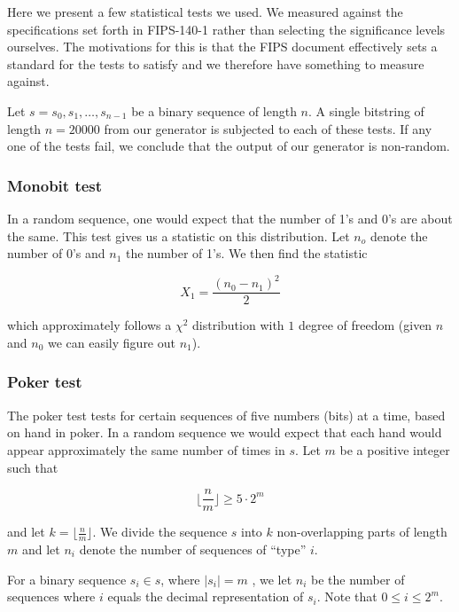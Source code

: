 \documentclass[a4paper]{article}           %
\begin{document}
 Here we present a few statistical tests we used. We measured against the specifications set forth in FIPS-140-1\cite{fips140, menezes1996} rather than selecting the significance levels ourselves. The motivations for this is that the FIPS document effectively sets a standard for the tests to satisfy and we therefore have something to measure against. 

Let $s = s_0, s_1, \ldots, s_{n-1}$ be a binary sequence of length $n$. A single bitstring of length $n = 20000$ from our generator is subjected to each of these tests. If any one of the tests fail, we conclude that the output of our generator is non-random. 

\subsubsection{Monobit test}

In a random sequence, one would expect that the number of 1's and 0's are about the same. This test gives us a statistic on this distribution. Let $n_o$ denote the number of 0's and $n_1$ the number of 1's. We then find the statistic

\begin{equation}
X_1 = \frac{(n_0 - n_1)^2}{2}
\end{equation}

which approximately follows a $\chi^2$ distribution with $1$ degree of freedom (given $n$ and $n_0$ we can easily figure out $n_1$). 

\subsubsection{Poker test}

The poker test tests for certain sequences of five numbers (bits) at a time, based on hand in poker. In a random sequence we would expect that each hand would appear approximately the same number of times in $s$. Let $m$ be a positive integer such that 

\[
\lfloor \frac n m \rfloor \geq 5 \cdot 2^m  
\]

and let $k = \lfloor \frac n m \rfloor$. We divide the sequence $s$ into $k$ non-overlapping parts of length $m$ and let $n_i$ denote the number of sequences of ``type'' $i$.

For a binary sequence $s_i \in s$, where $|s_i| = m$ , we let $n_i$ be the number of sequences where $i$ equals the decimal representation of $s_i$. Note that $0 \leq i \leq 2^m$. 
\end{document}
